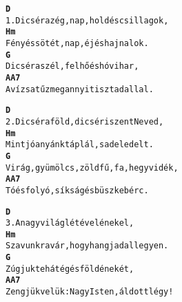 \newpage
{}
\kottastart
{}
\kottaend
\begin{minipage}{\textwidth}
\begin{alltt}
\textbf{    D}
1. Dicsér az ég, nap, hold és csillagok,
\textbf{    Hm}
   Fény és sötét, nap, éj és hajnalok.
\textbf{    G}
   Dicsér a szél, felhő és hóvihar,
\textbf{   A              A7}
   A víz s a tűz megannyi tiszta dallal.
\end{alltt}
\vspace{0.0cm}
\versszakspacing
\end{minipage}
\begin{minipage}{\textwidth}
\begin{alltt}
\textbf{    D}
2. Dicsér a föld, dicséri szent Neved,
\textbf{    Hm}
   Mint jó anyánk táplál, s ad eledelt.
\textbf{    G}
   Virág, gyümölcs, zöld fű, fa, hegyvidék,
\textbf{    A            A7}
   Tó és folyó, síkság és büszke bérc.
\end{alltt}
\vspace{0.0cm}
\versszakspacing
\end{minipage}
\begin{minipage}{\textwidth}
\begin{alltt}
\textbf{   D}
3. A nagyvilág létével énekel,
\textbf{     Hm}
   Szavunkra vár, hogy hangja dal legyen.
\textbf{    G}
   Zúgjuk tehát ég és föld énekét,
\textbf{    A              A7}
   Zengjük velük: Nagy Isten, áldott légy!
\end{alltt}
\vspace{0.0cm}
\versszakspacing
\end{minipage}

